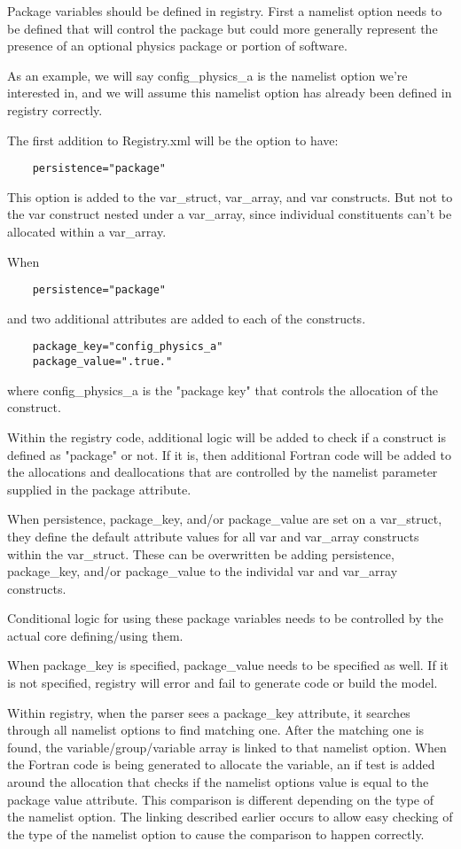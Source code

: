 \documentclass[11pt]{report}
\begin{document}
Package variables should be defined in registry. First a namelist option needs
to be defined that will control the package but could more generally represent
the presence of an optional physics package or portion of software. 

As an example, we will say config\_physics\_a is the namelist option we're
interested in, and we will assume this namelist option has already been defined
in registry correctly.

The first addition to Registry.xml will be the option to have:
\begin{lstlisting}
	persistence="package"
\end{lstlisting}

This option is added to the var\_struct, var\_array, and var constructs.
But not to the var construct nested under a var\_array, since individual
constituents can't be allocated within a var\_array.

When
\begin{lstlisting}
	persistence="package"
\end{lstlisting}
and two additional attributes are added to each of the constructs.
\begin{lstlisting}
	package_key="config_physics_a"
	package_value=".true."
\end{lstlisting}
where config\_physics\_a is the "package key" that controls the allocation of the construct.

Within the registry code, additional logic will be added to check if a
construct is defined as "package" or not. If it is, then additional Fortran
code will be added to the allocations and deallocations that are controlled by
the namelist parameter supplied in the package attribute.

When persistence, package\_key, and/or package\_value are set on a var\_struct,
they define the default attribute values for all var and var\_array constructs
within the var\_struct. These can be overwritten be adding persistence, 
package\_key, and/or package\_value to the individal var and var\_array constructs.

Conditional logic for using these package variables needs to be controlled by
the actual core defining/using them.

When package\_key is specified, package\_value needs to be specified as well.
If it is not specified, registry will error and fail to generate code or build
the model.

Within registry, when the parser sees a package\_key attribute, it searches
through all namelist options to find matching one. After the matching one is
found, the variable/group/variable array is linked to that namelist option.
When the Fortran code is being generated to allocate the variable, an if test
is added around the allocation that checks if the namelist options value is
equal to the package value attribute. This comparison is different depending on
the type of the namelist option. The linking described earlier occurs to allow
easy checking of the type of the namelist option to cause the comparison to
happen correctly.
\end{document}
